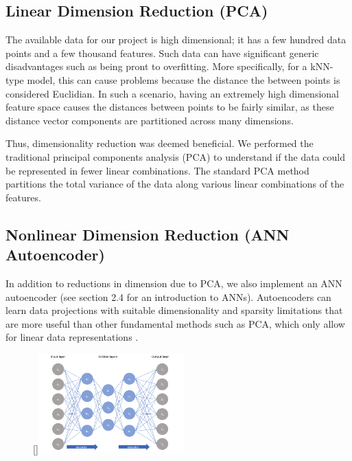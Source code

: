 \documentclass[11pt]{article}
\begin{document}
\subsection{Linear Dimension Reduction (PCA)}
The available data for our project is high dimensional; it has a few hundred data points and a few thousand features. Such data can have significant generic disadvantages such as being pront to overfitting. More specifically, for a kNN-type model, this can cause problems because the distance the between points is considered Euclidian. In such a scenario, having an extremely high dimensional feature space causes the distances between points to be fairly similar, as these distance vector components are partitioned across many dimensions. \autocite{nguyen2019ten} 

Thus, dimensionality reduction was deemed beneficial. We performed the traditional principal components analysis (PCA) to understand if the data could be represented in fewer linear combinations. The standard PCA method partitions the total variance of the data along various linear combinations of the features. 

\subsection{Nonlinear Dimension Reduction (ANN Autoencoder)}

In addition to reductions in dimension due to PCA, we also implement an ANN autoencoder (see section 2.4 for an introduction to ANNs). Autoencoders can learn data projections with suitable dimensionality and sparsity limitations that are more useful than other fundamental methods such as PCA, which only allow for linear data representations \autocite{Alkhayrat}.

\begin{figure}
    \begin{center}
        \raisebox{0pt}[\dimexpr{}\baselineskip\relax]{\includegraphics[width=0.5\textwidth]{autoencoder_diagram.png}}
    \end{center}
\end{figure}
\end{document}
